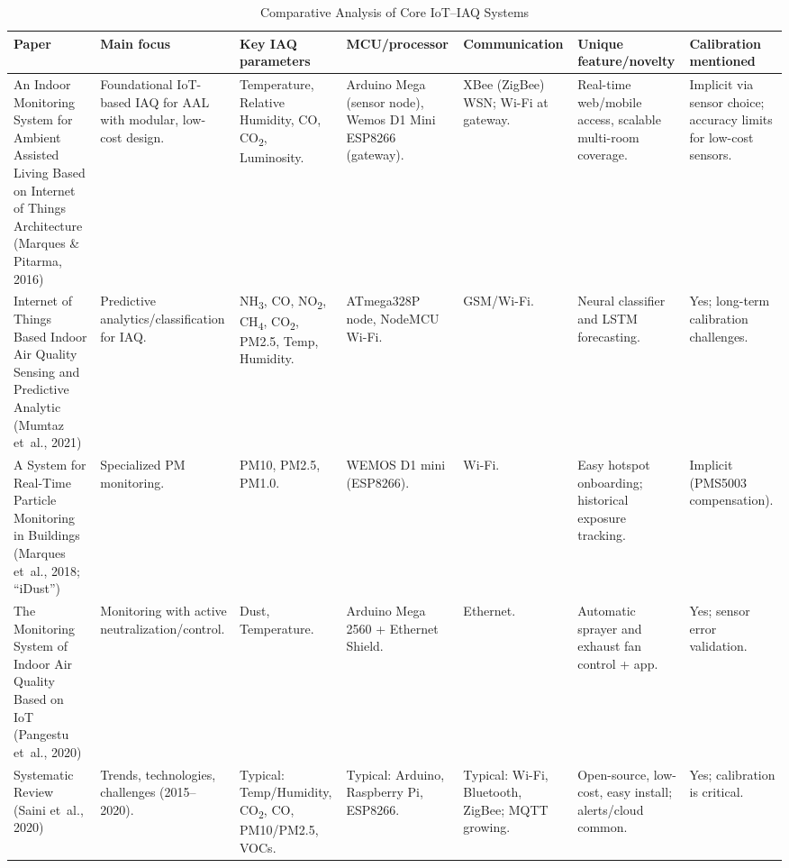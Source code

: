 \documentclass[12pt]{report}
\begin{document}
\begin{table}[htbp]
\centering
\scriptsize
\caption{Comparative Analysis of Core IoT--IAQ Systems}
\label{tab:comparative_iot_iaq}
\begin{tabularx}{\textwidth}{Y Y Y Y Y Y Y}
\toprule
\textbf{Paper} & \textbf{Main focus} & \textbf{Key IAQ parameters} & \textbf{MCU/processor} & \textbf{Communication} & \textbf{Unique feature/novelty} & \textbf{Calibration mentioned} \\
\midrule
An Indoor Monitoring System for Ambient Assisted Living Based on Internet of Things Architecture (Marques \& Pitarma, 2016) & Foundational IoT-based IAQ for AAL with modular, low-cost design. & Temperature, Relative Humidity, CO, CO\textsubscript{2}, Luminosity. & Arduino Mega (sensor node), Wemos D1 Mini ESP8266 (gateway). & XBee (ZigBee) WSN; Wi-Fi at gateway. & Real-time web/mobile access, scalable multi-room coverage. & Implicit via sensor choice; accuracy limits for low-cost sensors. \\
\addlinespace
Internet of Things Based Indoor Air Quality Sensing and Predictive Analytic (Mumtaz et~al., 2021) & Predictive analytics/classification for IAQ. & NH\textsubscript{3}, CO, NO\textsubscript{2}, CH\textsubscript{4}, CO\textsubscript{2}, PM2.5, Temp, Humidity. & ATmega328P node, NodeMCU Wi-Fi. & GSM/Wi-Fi. & Neural classifier and LSTM forecasting. & Yes; long-term calibration challenges. \\
\addlinespace
A System for Real-Time Particle Monitoring in Buildings (Marques et~al., 2018; ``iDust'') & Specialized PM monitoring. & PM10, PM2.5, PM1.0. & WEMOS D1 mini (ESP8266). & Wi-Fi. & Easy hotspot onboarding; historical exposure tracking. & Implicit (PMS5003 compensation). \\
\addlinespace
The Monitoring System of Indoor Air Quality Based on IoT (Pangestu et~al., 2020) & Monitoring with active neutralization/control. & Dust, Temperature. & Arduino Mega 2560 + Ethernet Shield. & Ethernet. & Automatic sprayer and exhaust fan control + app. & Yes; sensor error validation. \\
\addlinespace
Systematic Review (Saini et~al., 2020) & Trends, technologies, challenges (2015--2020). & Typical: Temp/Humidity, CO\textsubscript{2}, CO, PM10/PM2.5, VOCs. & Typical: Arduino, Raspberry Pi, ESP8266. & Typical: Wi-Fi, Bluetooth, ZigBee; MQTT growing. & Open-source, low-cost, easy install; alerts/cloud common. & Yes; calibration is critical. \\
\bottomrule
\end{tabularx}
\end{table}
\FloatBarrier
\end{document}
